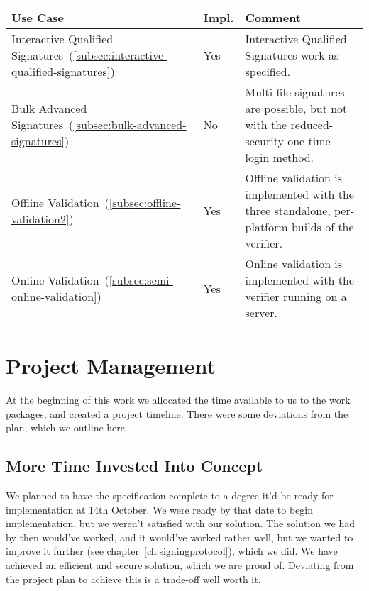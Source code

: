 \begin{center}
    \begin{longtable}{p{5.35cm}|p{0.7cm}|p{9.0cm}}
        \textbf{Use Case} & \textbf{Impl.} & \textbf{Comment}
        \\
        \hline
        Interactive Qualified Signatures~(\ref{subsec:interactive-qualified-signatures})
        & Yes
        & Interactive Qualified Signatures work as specified.
        \\
        \hline
        Bulk Advanced Signatures~(\ref{subsec:bulk-advanced-signatures})
        & No
        & Multi-file signatures are possible,
        but not with the reduced-security one-time login method.
        \\
        \hline
        Offline Validation~(\ref{subsec:offline-validation2})
        & Yes
        & Offline validation is implemented with the three standalone,
        per-platform builds of the verifier.
        \\
        \hline
        Online Validation~(\ref{subsec:semi-online-validation})
        & Yes
        & Online validation is implemented with the verifier running on a server.
        \\
        \hline
    \end{longtable}
\end{center}


\section{Project Management}\label{sec:project-management}
At the beginning of this work we allocated the time available to us
to the work packages, and created a project timeline.
There were some deviations from the plan,
which we outline here.

\subsection{More Time Invested Into Concept}\label{subsec:more-time-invested-into-concept}
We planned to have the specification complete to a degree it'd be ready for implementation at 14th October.
We were ready by that date to begin implementation,
but we weren't satisfied with our solution.
The solution we had by then would've worked, and it would've worked rather well,
but we wanted to improve it further (see chapter~\ref{ch:signingprotocol}), which we did.
We have achieved an efficient and secure solution, which we are proud of.
Deviating from the project plan to achieve this is a trade-off well worth it.

